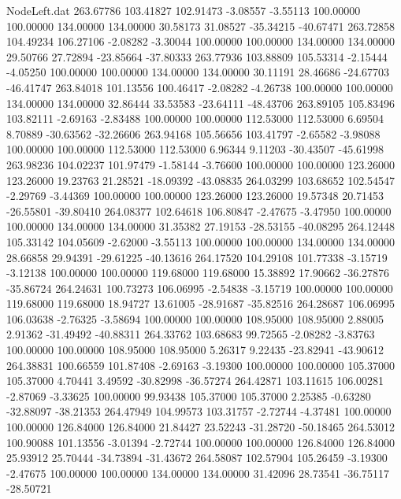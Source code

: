 \begin{filecontents}{NodeLeft.dat}
 263.67786  103.41827  102.91473    -3.08557   -3.55113  100.00000  100.00000  134.00000  134.00000   30.58173   31.08527  -35.34215  -40.67471
 263.72858  104.49234  106.27106    -2.08282   -3.30044  100.00000  100.00000  134.00000  134.00000   29.50766   27.72894  -23.85664  -37.80333
 263.77936  103.88809  105.53314    -2.15444   -4.05250  100.00000  100.00000  134.00000  134.00000   30.11191   28.46686  -24.67703  -46.41747
 263.84018  101.13556  100.46417    -2.08282   -4.26738  100.00000  100.00000  134.00000  134.00000   32.86444   33.53583  -23.64111  -48.43706
 263.89105  105.83496  103.82111    -2.69163   -2.83488  100.00000  100.00000  112.53000  112.53000    6.69504    8.70889  -30.63562  -32.26606
 263.94168  105.56656  103.41797    -2.65582   -3.98088  100.00000  100.00000  112.53000  112.53000    6.96344    9.11203  -30.43507  -45.61998
 263.98236  104.02237  101.97479    -1.58144   -3.76600  100.00000  100.00000  123.26000  123.26000   19.23763   21.28521  -18.09392  -43.08835
 264.03299  103.68652  102.54547    -2.29769   -3.44369  100.00000  100.00000  123.26000  123.26000   19.57348   20.71453  -26.55801  -39.80410
 264.08377  102.64618  106.80847    -2.47675   -3.47950  100.00000  100.00000  134.00000  134.00000   31.35382   27.19153  -28.53155  -40.08295
 264.12448  105.33142  104.05609    -2.62000   -3.55113  100.00000  100.00000  134.00000  134.00000   28.66858   29.94391  -29.61225  -40.13616
 264.17520  104.29108  101.77338    -3.15719   -3.12138  100.00000  100.00000  119.68000  119.68000   15.38892   17.90662  -36.27876  -35.86724
 264.24631  100.73273  106.06995    -2.54838   -3.15719  100.00000  100.00000  119.68000  119.68000   18.94727   13.61005  -28.91687  -35.82516
 264.28687  106.06995  106.03638    -2.76325   -3.58694  100.00000  100.00000  108.95000  108.95000    2.88005    2.91362  -31.49492  -40.88311
 264.33762  103.68683   99.72565    -2.08282   -3.83763  100.00000  100.00000  108.95000  108.95000    5.26317    9.22435  -23.82941  -43.90612
 264.38831  100.66559  101.87408    -2.69163   -3.19300  100.00000  100.00000  105.37000  105.37000    4.70441    3.49592  -30.82998  -36.57274
 264.42871  103.11615  106.00281    -2.87069   -3.33625  100.00000   99.93438  105.37000  105.37000    2.25385   -0.63280  -32.88097  -38.21353
 264.47949  104.99573  103.31757    -2.72744   -4.37481  100.00000  100.00000  126.84000  126.84000   21.84427   23.52243  -31.28720  -50.18465
 264.53012  100.90088  101.13556    -3.01394   -2.72744  100.00000  100.00000  126.84000  126.84000   25.93912   25.70444  -34.73894  -31.43672
 264.58087  102.57904  105.26459    -3.19300   -2.47675  100.00000  100.00000  134.00000  134.00000   31.42096   28.73541  -36.75117  -28.50721

\end{filecontents}
